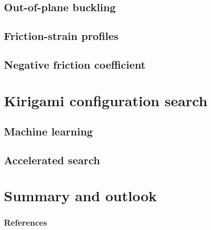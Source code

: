 \documentclass[
	10pt, %
]{beamer}
\begin{document}
\subsection{Out-of-plane buckling}
\subsection{Friction-strain profiles}
\subsection{Negative friction coefficient}


\section{Kirigami configuration search} %
\subsection{Machine learning}
\subsection{Accelerated search}



\section{Summary and outlook} %



\begin{frame}%
	\frametitle{References}
	\printbibliography
\end{frame}
\end{document}
